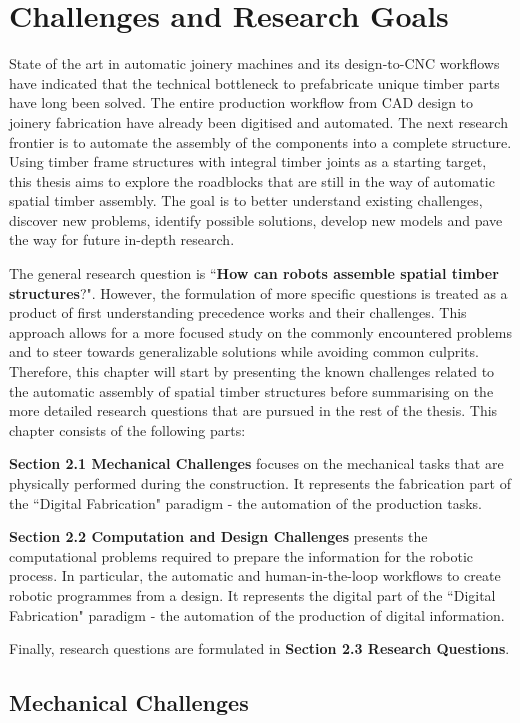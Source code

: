 \chapter{Challenges and Research Goals}

State of the art in automatic joinery machines and its design-to-CNC workflows have indicated that the technical bottleneck to prefabricate unique timber parts have long been solved. The entire production workflow from CAD design to joinery fabrication have already been digitised and automated. The next research frontier is to automate the assembly of the components into a complete structure. Using timber frame structures with integral timber joints as a starting target, this thesis aims to explore the roadblocks that are still in the way of automatic spatial timber assembly. The goal is to better understand existing challenges, discover new problems, identify possible solutions, develop new models and pave the way for future in-depth research.

The general research question is ``\textbf{How can robots assemble spatial timber structures}?". However, the formulation of more specific questions is treated as a product of first understanding precedence works and their challenges. This approach allows for a more focused study on the commonly encountered problems and to steer towards generalizable solutions while avoiding common culprits. Therefore, this chapter will start by presenting the known challenges related to the automatic assembly of spatial timber structures before summarising on the more detailed research questions that are pursued in the rest of the thesis. This chapter consists of the following parts: 

\textbf{Section 2.1 Mechanical Challenges }focuses on the mechanical tasks that are physically performed during the construction. It represents the fabrication part of the ``Digital Fabrication" paradigm - the automation of the production tasks.

\textbf{Section 2.2 Computation and Design Challenges} presents the computational problems required to prepare the information for the robotic process. In particular, the automatic and human-in-the-loop workflows to create robotic programmes from a design. It represents the digital part of the ``Digital Fabrication" paradigm - the automation of the production of digital information.

Finally, research questions are formulated in \textbf{Section 2.3 Research Questions}. 

\section{Mechanical Challenges}

